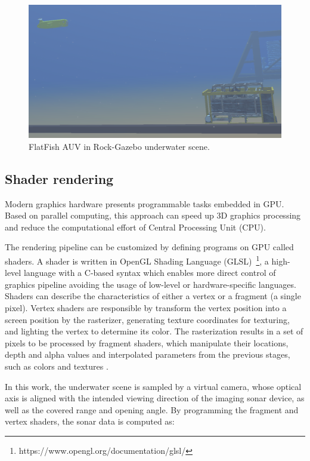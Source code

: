 \documentclass[final,5p,times]{elsarticle}
\begin{document}
\begin{figure}[!h]
    \includegraphics[width=\columnwidth]{figs/uwscene2}
    \centering
    \captionsetup{justification=centering}
    \caption{FlatFish AUV in Rock-Gazebo underwater scene.}
    \label{fig:uwscene}
\end{figure}


\subsection{Shader rendering}
\label{dev:shader}

Modern graphics hardware presents programmable tasks embedded in GPU. Based on parallel computing, this approach can speed up 3D graphics processing and reduce the computational effort of Central Processing Unit (CPU).

The rendering pipeline can be customized by defining programs on GPU called shaders. A shader is written in OpenGL Shading Language (GLSL)~\footnote{https://www.opengl.org/documentation/glsl/}, a high-level language with a C-based syntax which enables more direct control of graphics pipeline avoiding the usage of low-level or hardware-specific languages. Shaders can describe the characteristics of either a vertex or a fragment (a single pixel). Vertex shaders are responsible by transform the vertex position into a screen position by the rasterizer, generating texture coordinates for texturing, and lighting the vertex to determine its color. The rasterization results in a set of pixels to be processed by fragment shaders, which manipulate their locations, depth and alpha values and interpolated parameters from the previous stages, such as colors and textures \cite{fernando2003}.

In this work, the underwater scene is sampled by a virtual camera, whose optical axis is aligned with the intended viewing direction of the imaging sonar device, as well as the covered range and opening angle. By programming the fragment and vertex shaders, the sonar data is computed as:
\end{document}
